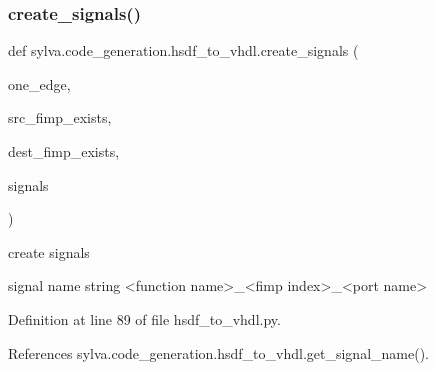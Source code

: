 \subsubsection{\texorpdfstring{create\+\_\+signals()}{create\_signals()}}
{\footnotesize\ttfamily def sylva.\+code\+\_\+generation.\+hsdf\+\_\+to\+\_\+vhdl.\+create\+\_\+signals (\begin{DoxyParamCaption}\item[{}]{one\+\_\+edge,  }\item[{}]{src\+\_\+fimp\+\_\+exists,  }\item[{}]{dest\+\_\+fimp\+\_\+exists,  }\item[{}]{signals }\end{DoxyParamCaption})}

\begin{DoxyVerb}create signals

  signal name
    string
    <function name>_<fimp index>_<port name>
\end{DoxyVerb}
 

Definition at line 89 of file hsdf\+\_\+to\+\_\+vhdl.\+py.



References sylva.\+code\+\_\+generation.\+hsdf\+\_\+to\+\_\+vhdl.\+get\+\_\+signal\+\_\+name().


